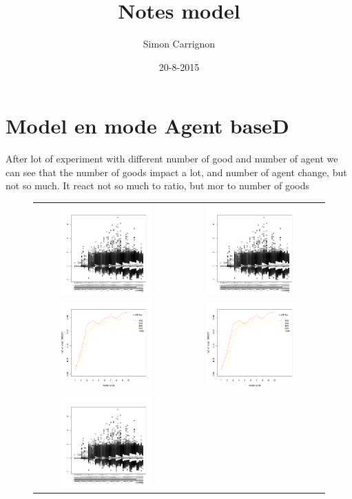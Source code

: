 \documentclass[a4paper]{article}
\title{Notes model}
\author{Simon Carrignon}
\date{20-8-2015}
\begin{document}
\section{Model en mode Agent baseD}
After lot of experiment with different number of good and number of agent we can see that the number of goods impact a lot, and number of agent change, but not so much. It react not so much to ratio, but mor to number of goods

\begin{figure}[htp]
    \centering
    \begin{tabular}{cc}
	\includegraphics[width=3.5cm]{interactionNGoodNAgent.pdf}
	\includegraphics[width=3.5cm]{interactionNGoodNAgentSD.pdf} &
	\includegraphics[width=3.5cm]{interactionNGoodNAgent.pdf}
	\includegraphics[width=3.5cm]{interactionNGoodNAgentSD.pdf} \\
	\includegraphics[width=3.5cm]{interactionNGoodNAgent.pdf}

\end{tabular}
\end{figure}
\end{document}
